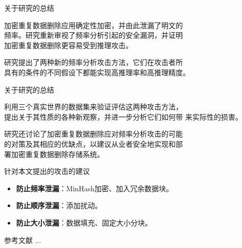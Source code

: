 \documentclass[aspectratio=43]{beamer}
\begin{document}
\begin{frame}{关于研究的总结}
\begin{card}
加密重复数据删除应用确定性加密，并由此泄漏了明文的\\[2mm]
频率。研究重新审视了频率分析引起的安全漏洞，并证明\\[2mm]
加密重复数据删除更容易受到推理攻击。
\end{card}

\begin{card}
研究提出了两种新的频率分析攻击方法，它们在攻击者所\\[2mm]
具有的条件的不同假设下都能实现高推理率和高推理精度。
\end{card}
\end{frame}

\begin{frame}{关于研究的总结}
\begin{card}
利用三个真实世界的数据集来验证评估这两种攻击方法，\\[2mm]
提出关于其性质的各种新观察，并进一步分析它们如何带
来实际性的损害。
\end{card}
\begin{card}
研究还讨论了加密重复数据删除应对频率分析攻击的可能\\[2mm]
的对策及其相应的优缺点，以建议从业者安全地实现和部\\[2mm]
署加密重复数据删除存储系统。
\end{card}
\end{frame}

\begin{frame}{针对本文提出的攻击的建议}
\begin{card}
\begin{itemize}
    \item \textbf{防止频率泄漏}：MinHash加密、加入冗余数据块。
    \item \textbf{防止顺序泄漏}：添加扰动。
    \item \textbf{防止大小泄漏}：数据填充、固定大小分块。
\end{itemize}
\end{card}
\end{frame}

\begin{frame}{参考文献}
...
\end{frame}
\end{document}
